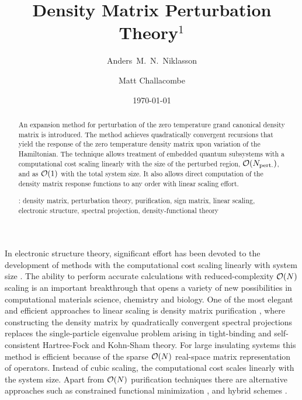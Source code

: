 \documentclass[prl,aps,twocolumn,showpacs,twocolumngrid,superbib]{revtex4}
\begin{document}
\title{Density Matrix Perturbation Theory$^1$}

\author{Anders~M.~N.~Niklasson} 
\author{Matt Challacombe}


\date{\today}

\begin{abstract}
{An expansion method for perturbation of the zero 
temperature grand canonical density matrix is introduced.
The method achieves quadratically convergent recursions that yield
the response of the zero temperature density matrix upon variation 
of the Hamiltonian. The technique allows treatment of embedded 
quantum subsystems with a computational cost scaling linearly 
with the size of the perturbed region, ${\cal O}(N_{\rm pert.})$, 
and as ${\cal O}(1)$ with the total system size. It also allows 
direct computation of the density matrix response functions to 
any order with linear scaling effort.

\smallskip
{}: density matrix, perturbation theory, purification, sign matrix,
linear scaling, electronic structure, spectral projection, density-functional theory}
\end{abstract}
 

\maketitle



In electronic structure 
theory, significant effort has been devoted to the development of
methods with the computational cost scaling linearly with system size 
\cite{Goedecker_RMP_99,Wu02}. The ability to perform accurate calculations
with reduced-complexity ${\cal O}(N)$ scaling is an important breakthrough 
that opens a variety of new possibilities in computational materials science, 
chemistry and biology. One of the most elegant and efficient approaches 
to linear scaling is density matrix purification 
\cite{McWeeny60,Clinton69,Palser98,Holas01,NiklassonWLT,NiklassonSP2,NiklassonSP4},
where constructing the density matrix by quadratically convergent spectral projections 
replaces the single-particle eigenvalue problem arising in tight-binding and 
self-consistent Hartree-Fock and Kohn-Sham theory. For large insulating systems 
this method is efficient because of the sparse ${\cal O}(N)$ real-space matrix 
representation of operators.  Instead of cubic scaling, the computational cost 
scales linearly with the system size.  Apart from ${\cal O}(N)$ purification 
techniques there are alternative approaches such as constrained functional 
minimization \cite{Li93,Kohn96}, and hybrid schemes
\cite{Challa99,Bowler99,Daniels99,Helgaker2000,Head_Gordon2003}. 
\end{document}
